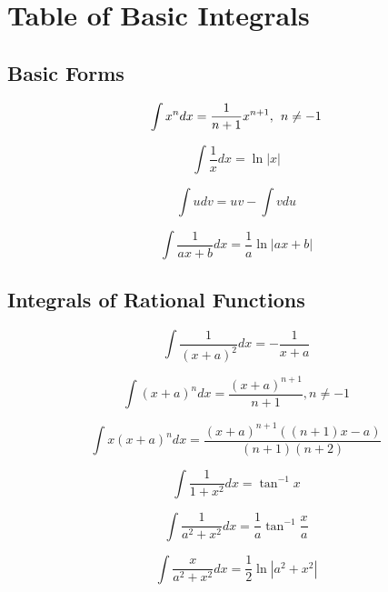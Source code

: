 
\chapter{Table of Basic Integrals}


\section*{Basic Forms}

\begin{equation}
\int x^n dx = \frac{1}{n+1}x^{n+1},\hspace{1ex}n\neq -1
\end{equation}

\begin{equation}
\int \frac{1}{x}dx = \ln |x|
\end{equation}

\begin{equation}
\int u dv = uv - \int v du
\end{equation}

\begin{equation}
\int \frac{1}{ax+b}dx = \frac{1}{a} \ln |ax + b| 
\end{equation}

\section* {Integrals of Rational Functions}

\begin{equation}
\int \frac{1}{(x+a)^2}dx = -\frac{1}{x+a}
\end{equation}

\begin{equation}
\int (x+a)^n dx = \frac{(x+a)^{n+1}}{n+1}, n\ne -1
\end{equation}

\begin{equation}
\int x(x+a)^n dx = \frac{(x+a)^{n+1} ( (n+1)x-a)}{(n+1)(n+2)}
\end{equation}

\begin{equation}
\int \frac{1}{1+x^2}dx = \tan^{-1}x
\end{equation}

\begin{equation}
\int \frac{1}{a^2+x^2}dx = \frac{1}{a}\tan^{-1}\frac{x}{a}
\end{equation}

\begin{equation}
\int \frac{x}{a^2+x^2}dx = \frac{1}{2}\ln|a^2+x^2|
\end{equation}

